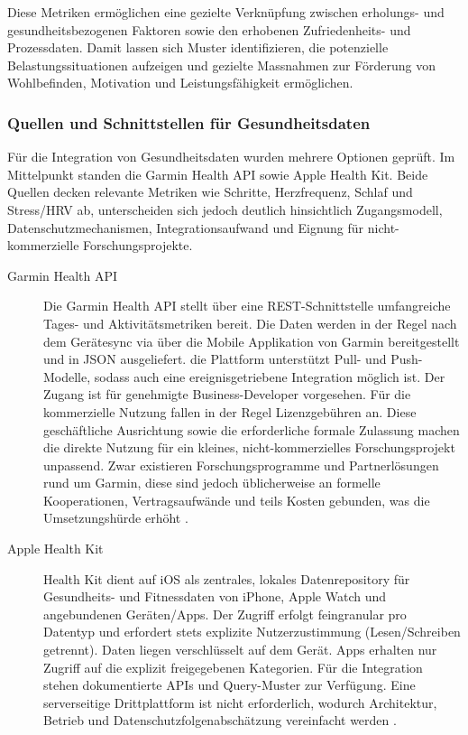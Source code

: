 \documentclass[12pt,a4paper]{report}
\begin{document}
Diese Metriken ermöglichen eine gezielte Verknüpfung zwischen erholungs- und gesundheitsbezogenen Faktoren sowie den erhobenen
Zufriedenheits- und Prozessdaten. Damit lassen sich Muster identifizieren, die potenzielle Belastungssituationen aufzeigen und 
gezielte Massnahmen zur Förderung von Wohlbefinden, Motivation und Leistungsfähigkeit ermöglichen.

\subsubsection{Quellen und Schnittstellen für Gesundheitsdaten}

Für die Integration von Gesundheitsdaten wurden mehrere Optionen geprüft. Im Mittelpunkt standen die Garmin Health API sowie Apple
Health Kit. Beide Quellen decken relevante Metriken wie Schritte, Herzfrequenz, Schlaf und Stress/HRV ab, unterscheiden sich jedoch
deutlich hinsichtlich Zugangsmodell, Datenschutzmechanismen, Integrationsaufwand und Eignung für nicht-kommerzielle 
Forschungsprojekte.

\begin{description}
  \item[Garmin Health API] Die Garmin Health API stellt über eine REST-Schnittstelle umfangreiche Tages- und Aktivitätsmetriken 
    bereit. Die Daten werden in der Regel nach dem Gerätesync via über die Mobile Applikation von Garmin bereitgestellt und in
    JSON ausgeliefert. die Plattform unterstützt Pull- und Push-Modelle, sodass auch eine ereignisgetriebene Integration möglich
    ist. Der Zugang ist für genehmigte Business-Developer vorgesehen. Für die kommerzielle Nutzung fallen in der Regel
    Lizenzgebühren an. Diese geschäftliche Ausrichtung sowie die erforderliche formale Zulassung machen die direkte Nutzung für
    ein kleines, nicht-kommerzielles Forschungsprojekt unpassend. Zwar existieren Forschungsprogramme und Partnerlösungen rund um
    Garmin, diese sind jedoch üblicherweise an formelle Kooperationen, Vertragsaufwände und teils Kosten gebunden, was die
    Umsetzungshürde erhöht \cite{garmin_healthapi_2025}.
  \item[Apple Health Kit] Health Kit dient auf iOS als zentrales, lokales Datenrepository für Gesundheits- und Fitnessdaten von 
    iPhone, Apple Watch und angebundenen Geräten/Apps. Der Zugriff erfolgt feingranular pro Datentyp und erfordert stets explizite
    Nutzerzustimmung (Lesen/Schreiben getrennt). Daten liegen verschlüsselt auf dem Gerät. Apps erhalten nur Zugriff auf die
    explizit freigegebenen Kategorien. Für die Integration stehen dokumentierte APIs und Query-Muster zur Verfügung. Eine
    serverseitige Drittplattform ist nicht erforderlich, wodurch Architektur, Betrieb und Datenschutzfolgenabschätzung vereinfacht
    werden \cite{apple_healthkit_2025}.
\end{description}
\end{document}
